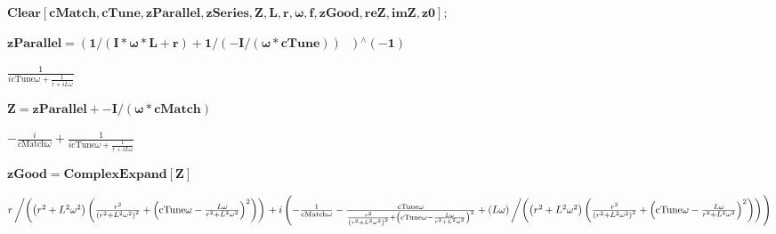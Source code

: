 \documentclass{article}
\begin{document}
\begin{doublespace}
\noindent\(\pmb{\text{Clear}[\text{cMatch}, \text{cTune}, \text{zParallel}, \text{zSeries}, Z, L, r, \omega , f, \text{zGood}, \text{reZ}, \text{imZ},
\text{z0}];}\)
\end{doublespace}

\begin{doublespace}
\noindent\(\pmb{\text{zParallel} = ( 1/(I*\omega *L+r) + 1/(-I/(\omega *\text{cTune}))\text{  }){}^{\wedge}(-1)}\)
\end{doublespace}

\begin{doublespace}
\noindent\(\frac{1}{i \text{cTune} \omega +\frac{1}{r+i L \omega }}\)
\end{doublespace}

\begin{doublespace}
\noindent\(\pmb{Z = \text{zParallel} + -I / (\omega *\text{cMatch})}\)
\end{doublespace}

\begin{doublespace}
\noindent\(-\frac{i}{\text{cMatch} \omega }+\frac{1}{i \text{cTune} \omega +\frac{1}{r+i L \omega }}\)
\end{doublespace}

\begin{doublespace}
\noindent\(\pmb{\text{zGood} = \text{ComplexExpand}[Z]}\)
\end{doublespace}

\begin{doublespace}
\noindent\(r\left/\left(\left(r^2+L^2 \omega ^2\right) \left(\frac{r^2}{\left(r^2+L^2 \omega ^2\right)^2}+\left(\text{cTune} \omega -\frac{L \omega
}{r^2+L^2 \omega ^2}\right)^2\right)\right)\right.+i \left(-\frac{1}{\text{cMatch} \omega }-\frac{\text{cTune} \omega }{\frac{r^2}{\left(r^2+L^2
\omega ^2\right)^2}+\left(\text{cTune} \omega -\frac{L \omega }{r^2+L^2 \omega ^2}\right)^2}+(L \omega )\left/\left(\left(r^2+L^2 \omega ^2\right)
\left(\frac{r^2}{\left(r^2+L^2 \omega ^2\right)^2}+\left(\text{cTune} \omega -\frac{L \omega }{r^2+L^2 \omega ^2}\right)^2\right)\right)\right.\right)\)
\end{doublespace}
\end{document}
